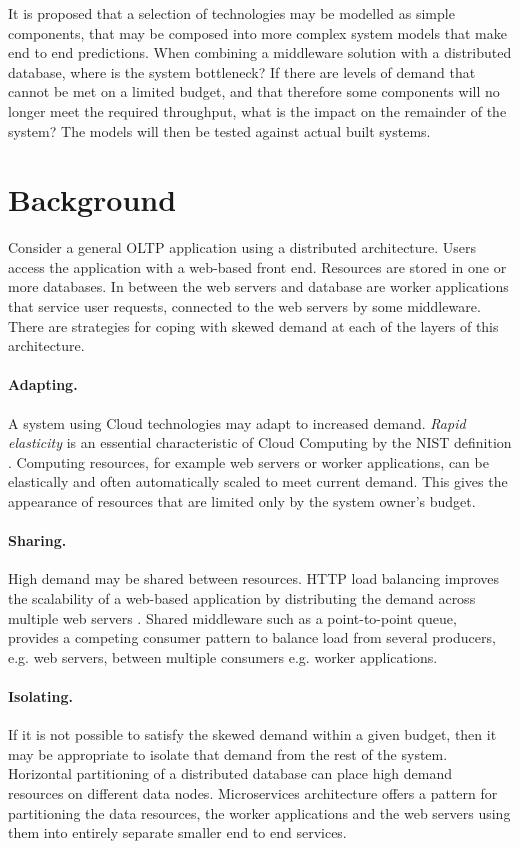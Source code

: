 \documentclass[runningheads]{llncs}
\begin{document}
It is proposed that a selection of technologies may be modelled as simple components, that may be composed into more complex system models that make end to end predictions.  When combining a middleware solution with a distributed database, where is the system bottleneck?  If there are levels of demand that cannot be met on a limited budget, and that therefore some components will no longer meet the required throughput, what is the impact on the remainder of the system?  The models will then be tested against actual built systems.

%
%

\section{Background}

Consider a general OLTP application using a distributed architecture.  Users access the application with a web-based front end.  Resources are stored in one or more databases.  In between the web servers and database are worker applications that service user requests, connected to the web servers by some middleware.  There are strategies for coping with skewed demand at each of the layers of this architecture.

\paragraph{Adapting.} A system using Cloud technologies may adapt to increased demand. {\itshape Rapid elasticity} is an essential characteristic of Cloud Computing by the NIST definition \cite{RN56}.  Computing resources, for example web servers or worker applications, can be elastically and often automatically scaled to meet current demand.  This gives the appearance of resources that are limited only by the system owner's budget.

\paragraph{Sharing.} High demand may be shared between resources.  HTTP load balancing improves the scalability of a web-based application by distributing the demand across multiple web servers \cite{RN73}.  Shared middleware such as a point-to-point queue, provides a competing consumer pattern to balance load from several producers, e.g. web servers, between multiple consumers e.g. worker applications.

\paragraph{Isolating.} If it is not possible to satisfy the skewed demand within a given budget, then it may be appropriate to isolate that demand from the rest of the system.  Horizontal partitioning of a distributed database can place high demand resources on different data nodes.  Microservices architecture offers a pattern for partitioning the data resources, the worker applications and the web servers using them into entirely separate smaller end to end services.
\end{document}
